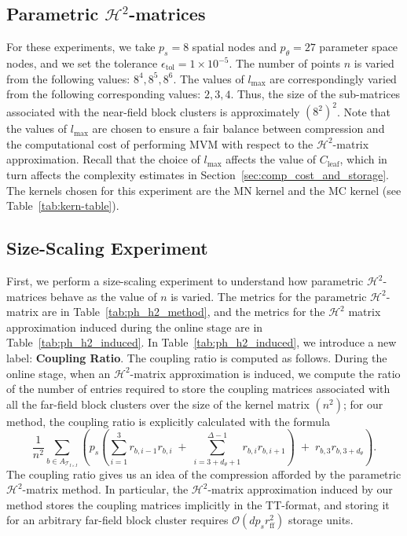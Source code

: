 \documentclass[final,3p,times]{elsarticle}
\newcommand{\mc}[1]{\mathcal{#1}}
\begin{document}
\subsection{Parametric \texorpdfstring{$\mc{H}^{2}$}{}-matrices}\label{ssec:param_H2_exp}
For these experiments, we take $p_{s} = 8$ spatial nodes and $p_{\theta} = 27$ parameter space nodes, and we set the tolerance $\epsilon_{\text{tol}} = 1 \times 10^{-5}$. The number of points $n$ is varied from the following values: $8^4, 8^5, 8^6$. The values of $l_{\max}$ are correspondingly varied from the following corresponding values: $2, 3, 4$. Thus, the size of the sub-matrices associated with the near-field block clusters is approximately $(8^2)^2$. Note that the values of $l_{\max}$ are chosen to ensure a fair balance between compression and the computational cost of performing MVM with respect to the $\mc{H}^{2}$-matrix approximation. Recall that the choice of $l_{\max}$ affects the value of $C_{\text{leaf}}$, which in turn affects the complexity estimates in Section~\ref{sec:comp_cost_and_storage}. The kernels chosen for this experiment are the MN kernel and the MC kernel (see Table~\ref{tab:kern-table}).


\subsection{Size-Scaling Experiment}\label{sssec:param_H2_exp_size_scaling}
First, we perform a size-scaling experiment  to understand how parametric $\mc{H}^{2}$-matrices behave as the value of $n$ is varied. The metrics for the parametric $\mc{H}^{2}$-matrix are in Table~\ref{tab:ph_h2_method}, and the metrics for the $\mc{H}^{2}$ matrix approximation induced during the online stage  are in Table~\ref{tab:ph_h2_induced}. In Table~\ref{tab:ph_h2_induced},  we introduce a new label: \textbf{Coupling Ratio}.
The coupling ratio is computed as follows. During the online stage, when an $\mc{H}^{2}$-matrix approximation is induced, we compute the ratio of the number of entries required to store the coupling matrices associated with all the far-field block clusters over the size of the kernel matrix $(n^2)$; for our method, the coupling ratio is  explicitly calculated with the  formula
\[
\frac{1}{n^{2}}
\sum_{b \in A_{\mathcal{T}_{I \times I}}} 
\left(
    p_{s} \left(
        \sum_{i=1}^{3} r_{b, i-1} r_{b, i} 
        \;+\;
        \sum_{i = 3+d_\theta + 1}^{\Delta-1} r_{b, i} r_{b, i+1}
    \right)
    \;+\;
    r_{b,3} r_{b, 3+d_\theta}
\right).
\]
The coupling ratio gives us an idea of the compression afforded by the parametric $\mc{H}^{2}$-matrix method. In particular, the $\mc{H}^{2}$-matrix approximation induced by our method stores the coupling matrices implicitly in the TT-format, and storing it for an arbitrary far-field block cluster requires $\mc{O}( dp_sr_{\text{ff}}^2)$ storage units. 
\end{document}
